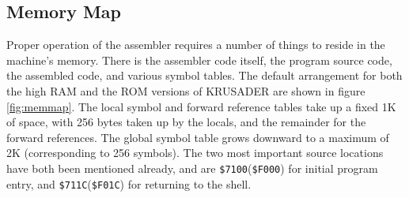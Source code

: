 \documentclass[12pt]{article}
\newcommand{\krusader}{\textsf{KRUSADER}\xspace}
\begin{document}
\subsection{Memory Map}
\label{sec:memory}

Proper operation of the assembler requires a number of things to reside in the machine's memory.
There is the assembler code itself, the program source code, the assembled code, and various
symbol tables.  The default arrangement for both the high RAM and the ROM versions of \krusader
are shown in figure \ref{fig:memmap}.  The local symbol and forward reference tables take up a
fixed 1K of space, with 256 bytes taken up by the locals, and the remainder for the forward references.
The global symbol table grows downward to a maximum of 2K (corresponding to 256 symbols).  
The two most important source locations have both been mentioned already, and are \texttt{\$7100}(\texttt{\$F000}) 
for initial program entry, and \texttt{\$711C}(\texttt{\$F01C}) for returning to the shell.
\end{document}
